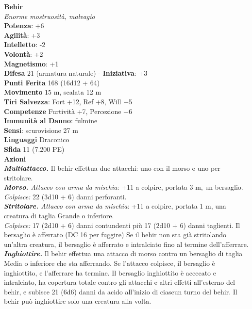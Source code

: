 \begin{multicols}{2}
\medskip\textbf{Behir}\\
\emph{Enorme mostruosità, malvagio}\\
\textbf{Potenza}: +6\\
\textbf{Agilità}: +3\\
\textbf{Intelletto}: -2\\
\textbf{Volontà}: +2\\
\textbf{Magnetismo}: +1\\
\textbf{Difesa} 21 (armatura naturale) - \textbf{Iniziativa}: +3\\
\textbf{Punti Ferita} 168 (16d12 + 64)\\
\textbf{Movimento} 15 m, scalata 12 m\\
\textbf{Tiri Salvezza}: Fort +12, Ref +8, Will +5\\
\textbf{Competenze} Furtività +7, Percezione +6\\
\textbf{Immunità al Danno}: fulmine\\
\textbf{Sensi}: scurovisione 27 m\\
\textbf{Linguaggi} Draconico\\
\textbf{Sfida} 11 (7.200 PE)\smallskip\\
\smallskip\textbf{Azioni}\\
\emph{\textbf{Multiattacco.}} Il behir effettua due attacchi: uno con il morso e uno per stritolare.\\
\emph{\textbf{Morso.} Attacco con arma da mischia}: +11 a colpire, portata 3 m, un bersaglio.\\
\emph{Colpisce:} 22 (3d10 + 6) danni perforanti.\\
\emph{\textbf{Stritolare.} Attacco con arma da mischia}: +11 a colpire, portata 1 m, una creatura di taglia Grande o inferiore.\\
\emph{Colpisce:} 17 (2d10 + 6) danni contundenti più 17 (2d10 + 6) danni taglienti. Il bersaglio è afferrato (DC 16 per fuggire) Se il behir non sta già stritolando un'altra creatura, il bersaglio è afferrato e intralciato fino al termine dell'afferrare.\\
\emph{\textbf{Inghiottire.}} Il behir effettua una attacco di morso contro un bersaglio di taglia Media o inferiore che sta afferrando. Se l'attacco colpisce, il bersaglio è inghiottito, e l'afferrare ha termine. Il bersaglio inghiottito è accecato e intralciato, ha copertura totale contro gli attacchi e altri effetti all'esterno del behir, e subisce 21 (6d6) danni da acido all'inizio di ciascun turno del behir. Il behir può inghiottire solo una creatura alla volta.\\

\end{multicols}
